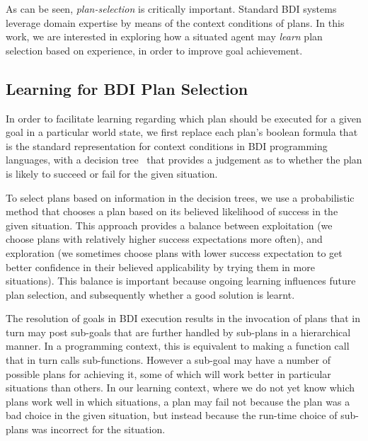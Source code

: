 As can be seen, \textit{plan-selection} is critically important.
Standard BDI systems leverage domain
expertise by means of the context conditions of plans.
In this work, we are interested in exploring how a situated agent may
\emph{learn} plan selection based on experience, in order to improve goal
achievement. 


\subsection{Learning for BDI Plan Selection} \label{subsec:bdi_learning}
In order to facilitate learning regarding which plan should be
executed for a given goal in a particular world state, we first replace each plan's
boolean formula that is the standard representation for context
conditions in BDI programming languages, with a decision
tree~\cite{Mitchell97:ML} that provides a judgement as to whether the
plan is likely to succeed or fail for the given situation. 

To select plans based on information in the decision trees, we use a
probabilistic method that chooses a plan based on its believed likelihood of success in the
given situation. This approach provides a balance between
exploitation (we choose plans with relatively higher success expectations
more often), and exploration (we sometimes choose plans with lower
success expectation to get better
confidence in their believed applicability by trying them in more 
situations).
%
This balance is important because ongoing learning influences future plan selection, and subsequently whether a good solution is learnt.


The resolution of goals in BDI execution results in 
the invocation of plans that in turn may post sub-goals that are further
handled by sub-plans in a hierarchical manner. In a programming context,
this is equivalent to making a function call that in turn calls sub-functions.
However a sub-goal may have a number of possible plans for achieving
it, some of which will work better in particular situations than
others. In our learning context, where we do not yet know which plans
work well in which situations, a plan may fail not because the plan
was a bad choice in the given situation, but instead because the
run-time choice of sub-plans was incorrect for the situation.

